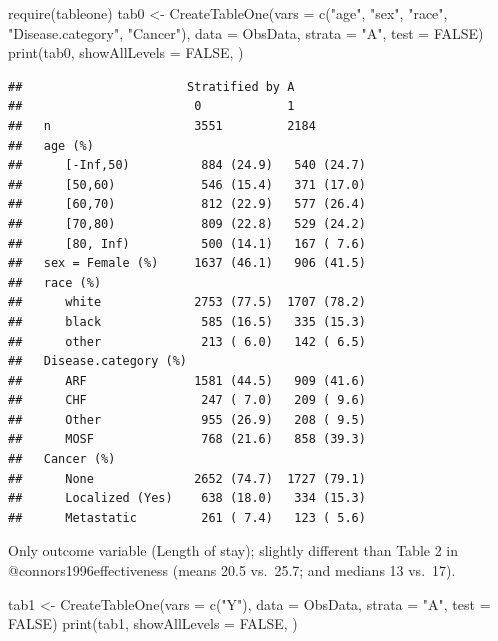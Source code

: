 \documentclass[
]{book}
\newenvironment{Shaded}{\begin{snugshade}}{\end{snugshade}}
\newcommand{\AttributeTok}[1]{\textcolor[rgb]{0.77,0.63,0.00}{#1}}
\newcommand{\ConstantTok}[1]{\textcolor[rgb]{0.00,0.00,0.00}{#1}}
\newcommand{\FunctionTok}[1]{\textcolor[rgb]{0.00,0.00,0.00}{#1}}
\newcommand{\NormalTok}[1]{#1}
\newcommand{\OtherTok}[1]{\textcolor[rgb]{0.56,0.35,0.01}{#1}}
\newcommand{\StringTok}[1]{\textcolor[rgb]{0.31,0.60,0.02}{#1}}
\begin{document}
\begin{Shaded}
\begin{Highlighting}[]
\FunctionTok{require}\NormalTok{(tableone)}
\NormalTok{tab0 }\OtherTok{\textless{}{-}} \FunctionTok{CreateTableOne}\NormalTok{(}\AttributeTok{vars =} \FunctionTok{c}\NormalTok{(}\StringTok{"age"}\NormalTok{, }\StringTok{"sex"}\NormalTok{, }\StringTok{"race"}\NormalTok{, }\StringTok{"Disease.category"}\NormalTok{, }\StringTok{"Cancer"}\NormalTok{),}
                       \AttributeTok{data =}\NormalTok{ ObsData, }
                       \AttributeTok{strata =} \StringTok{"A"}\NormalTok{, }
                       \AttributeTok{test =} \ConstantTok{FALSE}\NormalTok{)}
\FunctionTok{print}\NormalTok{(tab0, }\AttributeTok{showAllLevels =} \ConstantTok{FALSE}\NormalTok{, )}
\end{Highlighting}
\end{Shaded}

\begin{verbatim}
##                       Stratified by A
##                        0            1           
##   n                    3551         2184        
##   age (%)                                       
##      [-Inf,50)          884 (24.9)   540 (24.7) 
##      [50,60)            546 (15.4)   371 (17.0) 
##      [60,70)            812 (22.9)   577 (26.4) 
##      [70,80)            809 (22.8)   529 (24.2) 
##      [80, Inf)          500 (14.1)   167 ( 7.6) 
##   sex = Female (%)     1637 (46.1)   906 (41.5) 
##   race (%)                                      
##      white             2753 (77.5)  1707 (78.2) 
##      black              585 (16.5)   335 (15.3) 
##      other              213 ( 6.0)   142 ( 6.5) 
##   Disease.category (%)                          
##      ARF               1581 (44.5)   909 (41.6) 
##      CHF                247 ( 7.0)   209 ( 9.6) 
##      Other              955 (26.9)   208 ( 9.5) 
##      MOSF               768 (21.6)   858 (39.3) 
##   Cancer (%)                                    
##      None              2652 (74.7)  1727 (79.1) 
##      Localized (Yes)    638 (18.0)   334 (15.3) 
##      Metastatic         261 ( 7.4)   123 ( 5.6)
\end{verbatim}

\begin{rmdcomment}
Only outcome variable (Length of stay); slightly different than Table 2
in @connors1996effectiveness (means 20.5 vs.~25.7; and medians 13
vs.~17).
\end{rmdcomment}

\begin{Shaded}
\begin{Highlighting}[]
\NormalTok{tab1 }\OtherTok{\textless{}{-}} \FunctionTok{CreateTableOne}\NormalTok{(}\AttributeTok{vars =} \FunctionTok{c}\NormalTok{(}\StringTok{"Y"}\NormalTok{),}
                       \AttributeTok{data =}\NormalTok{ ObsData, }
                       \AttributeTok{strata =} \StringTok{"A"}\NormalTok{, }
                       \AttributeTok{test =} \ConstantTok{FALSE}\NormalTok{)}
\FunctionTok{print}\NormalTok{(tab1, }\AttributeTok{showAllLevels =} \ConstantTok{FALSE}\NormalTok{, )}
\end{Highlighting}
\end{Shaded}
\end{document}
